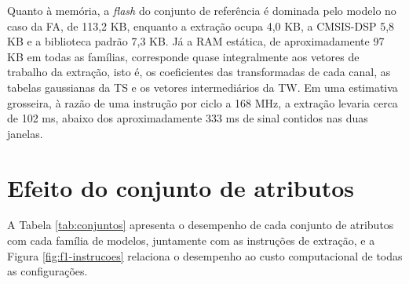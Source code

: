 \documentclass[
	12pt,				%
	openright,			%
	oneside,			%
	a4paper,			%
	english,			%
	brazil,				%
	]{abntex2}
\begin{document}
Quanto à memória, a \textit{flash} do conjunto de referência é dominada pelo modelo no caso da FA, de 113,2 KB, enquanto a extração ocupa 4,0 KB, a CMSIS-DSP 5,8 KB e a biblioteca padrão 7,3 KB. Já a RAM estática, de aproximadamente 97 KB em todas as famílias, corresponde quase integralmente aos vetores de trabalho da extração, isto é, os coeficientes das transformadas de cada canal, as tabelas gaussianas da TS e os vetores intermediários da TW. Em uma estimativa grosseira, à razão de uma instrução por ciclo a 168 MHz, a extração levaria cerca de 102 ms, abaixo dos aproximadamente 333 ms de sinal contidos nas duas janelas.

\section{Efeito do conjunto de atributos}
A Tabela \ref{tab:conjuntos} apresenta o desempenho de cada conjunto de atributos com cada família de modelos, juntamente com as instruções de extração, e a Figura \ref{fig:f1-instrucoes} relaciona o desempenho ao custo computacional de todas as configurações.

\begin{table}[htb]
\end{table}
\end{document}
